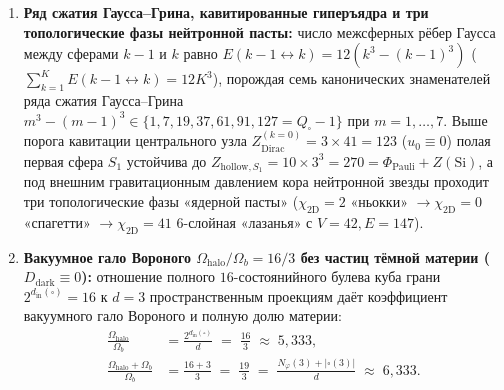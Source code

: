 \begin{theorem}
\begin{enumerate}[label=\textbf{(\arabic*)},leftmargin=*]
  \begin{equation}
    \label{eq:mono-stasis-833}
    D_{\max}(3) \;=\; \bigl(1 + N_\varphi(3)\cdot K_P(3)\bigr)\,\varepsilon(3) \;=\; (1 + 13\times 64)\times 8\,192 \;=\; 833 \times 8\,192 \;=\; 6\,823\,936,
  \end{equation}
  где $D_{\max}/\varepsilon = 833 = 7^2 \times 17 = d_{\mathrm{out}}(V)^2\,(N_\varphi + d_{\mathrm{in}}(\square))$, радиальный ток на противофазном горизонте обращается в нуль ($\mathcal{S}_3(256) = 0$), а побитовая обратимость шага Верле сохраняет всю информацию без потерь (устраняя гравитационную сингулярность $1/0$ и информационный парадокс Хокинга).
\item \textbf{Ряд сжатия Гаусса--Грина, кавитированные гиперъядра и три топологические фазы нейтронной пасты:}
  число межсферных рёбер Гаусса между сферами $k-1$ и $k$ равно $E(k-1\leftrightarrow k) = 12(k^3 - (k-1)^3)$ ($\sum_{k=1}^K E(k-1\leftrightarrow k) = 12 K^3$), порождая семь канонических знаменателей ряда сжатия Гаусса--Грина $m^3 - (m-1)^3 \in \{1, 7, 19, 37, 61, 91, 127 = Q_\square - 1\}$ при $m = 1,\dots,7$. Выше порога кавитации центрального узла $Z_{\mathrm{Dirac}}^{(k=0)} = 3\times 41 = 123$ ($u_0 \equiv 0$) полая первая сфера $S_1$ устойчива до $Z_{\mathrm{hollow},S_1} = 10\times 3^3 = 270 = \Phi_{\mathrm{Pauli}} + Z(\mathrm{Si})$, а под внешним гравитационным давлением кора нейтронной звезды проходит три топологические фазы «ядерной пасты» ($\chi_{\mathrm{2D}} = 2$ «ньокки» $\to \chi_{\mathrm{2D}} = 0$ «спагетти» $\to \chi_{\mathrm{2D}} = 41$ $6$-слойная «лазанья» с $V = 42, E = 147$).
\item \textbf{Вакуумное гало Вороного $\Omega_{\mathrm{halo}}/\Omega_b = 16/3$ без частиц тёмной материи ($D_{\mathrm{dark}} \equiv 0$):}
  отношение полного $16$-состоянийного булева куба грани $2^{d_{\mathrm{in}}(\square)} = 16$ к $d = 3$ пространственным проекциям даёт коэффициент вакуумного гало Вороного и полную долю материи:
  \begin{align}
    \frac{\Omega_{\mathrm{halo}}}{\Omega_b} &= \frac{2^{d_{\mathrm{in}}(\square)}}{d} \;=\; \frac{16}{3} \;\approx\; 5{,}333, \label{eq:mono-voronoi-halo-16-3} \\
    \frac{\Omega_{\mathrm{halo}} + \Omega_b}{\Omega_b} &= \frac{16 + 3}{3} \;=\; \frac{19}{3} \;=\; \frac{N_\varphi(3) + |\square(3)|}{d} \;\approx\; 6{,}333. \label{eq:mono-voronoi-halo-19-3}
  \end{align}
\end{enumerate}
\end{theorem}

